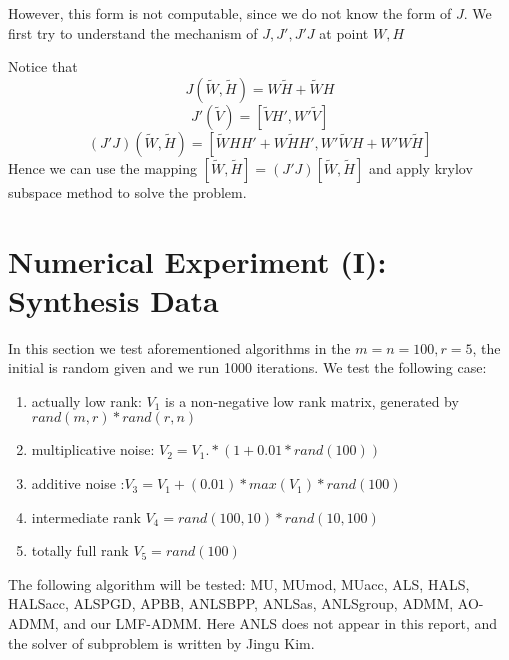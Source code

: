 \documentclass{article}
\begin{document}
However, this form is not computable, since we do not know the form of $J$. We first try to understand the mechanism of $J,J', J'J$ at point $W, H$

Notice that $$J(\tilde W, \tilde H) = W\tilde H + \tilde W H$$
$$J'(\tilde V) = [\tilde VH', W'\tilde V]$$
$$(J'J)(\tilde W, \tilde H) = [\tilde WHH' + W\tilde HH', W'\tilde WH + W'W\tilde H]$$ 
Hence we can use the mapping $[\tilde W, \tilde H] = (J'J)[\tilde W, \tilde H]$ and apply krylov subspace method to solve the problem.
\section{Numerical Experiment (I): Synthesis Data}
In this section we test aforementioned algorithms in the $m = n = 100, r = 5$, the initial is random given and we run 1000 iterations. We test the following case: 
\begin{enumerate}
	\item actually low rank: $V_1$ is a non-negative low rank matrix, generated by $rand(m,r)*rand(r,n)$
	\item multiplicative noise: $V_2 = V_1.*(1+0.01*rand(100))$
	\item additive noise :$V_3 =  V_1 + (0.01)*max(V_1)*rand(100)$
	\item intermediate rank $V_4 = rand(100,10)*rand(10,100)$
	\item totally full rank $V_5 = rand(100)$
\end{enumerate}

The following algorithm will be tested: MU, MUmod, MUacc, ALS, HALS, HALSacc, ALSPGD, APBB, ANLSBPP, ANLSas, ANLSgroup, ADMM, AO-ADMM, and our LMF-ADMM. Here ANLS does not appear in this report, and the solver of subproblem is written by Jingu Kim.
\end{document}
